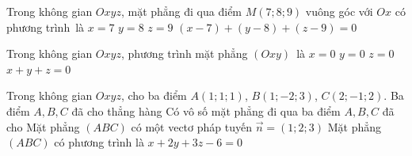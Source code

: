 \begin{ex}%
	Trong không gian $Oxyz$, mặt phẳng đi qua điểm $M\left(7;8;9 \right)$  vuông góc với $Ox$ có phương trình~là
	 \choice
		 {\True $x=7$}
		{$y=8$} 
		{$z=9$} 
		{$\left(x-7 \right)+\left(y-8 \right)+\left(z-9 \right)=0$} 
\end{ex}

\begin{ex}%
	Trong không gian $Oxyz$, phương trình mặt phẳng $(Oxy)$~là 
	\choice 
		{$x=0$} 
		 {$y=0$}
		{\True  $z=0$}
		{$x+y+z=0$} 
\end{ex}



\begin{ex}%
	Trong không gian $Oxyz$, cho ba điểm $A(1;  1; 1)$, $B(1; -2; 3)$, $C(2; -1; 2)$.
	 \choiceTF
		{Ba điểm $A, B, C$ đã cho  thẳng hàng}
		{Có vô số mặt phẳng đi  qua ba điểm $A, B, C$ đã cho}
		 {\True Mặt phẳng $(ABC)$ có một vectơ pháp tuyến $\overrightarrow{n} = (1; 2; 3)$}
		{\True Mặt phẳng $(ABC)$ có phương trình là $x  + 2y + 3z - 6 = 0$}
\end{ex}

